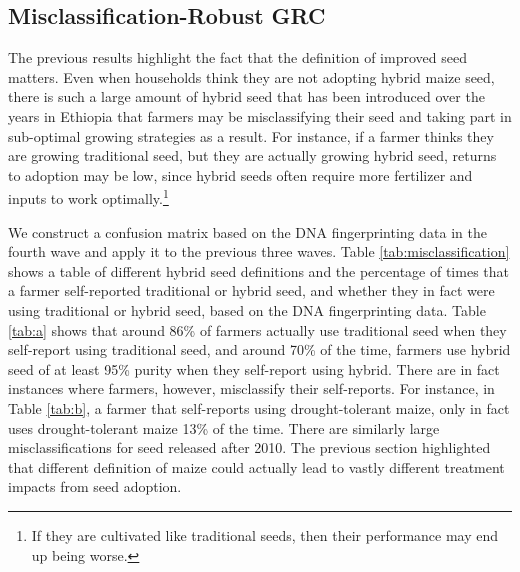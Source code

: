 \documentclass[11pt]{article}
\begin{document}


\subsection{Misclassification-Robust GRC}

The previous results highlight the fact that the definition of improved seed matters. Even when households think they are not adopting hybrid maize seed, there is such a large amount of hybrid seed that has been introduced over the years in Ethiopia that farmers may be misclassifying their seed and taking part in sub-optimal growing strategies as a result. For instance, if a farmer thinks they are growing traditional seed, but they are actually growing hybrid seed, returns to adoption may be low, since hybrid seeds often require more fertilizer and inputs to work optimally.\footnote{If they are cultivated like traditional seeds, then their performance may end up being worse.}

We construct a confusion matrix based on the DNA fingerprinting data in the fourth wave and apply it to the previous three waves. Table \ref{tab:misclassification} shows a table of different hybrid seed definitions and the percentage of times that a farmer self-reported traditional or hybrid seed, and whether they in fact were using traditional or hybrid seed, based on the DNA fingerprinting data. Table \ref{tab:a} shows that around 86\% of farmers actually use traditional seed when they self-report using traditional seed, and around 70\% of the time, farmers use hybrid seed of at least 95\% purity when they self-report using hybrid. There are in fact instances where farmers, however, misclassify their self-reports. For instance, in Table \ref{tab:b}, a farmer that self-reports using drought-tolerant maize, only in fact uses drought-tolerant maize 13\% of the time. There are similarly large misclassifications for seed released after 2010. The previous section highlighted that different definition of maize could actually lead to vastly different treatment impacts from seed adoption. 
\end{document}
